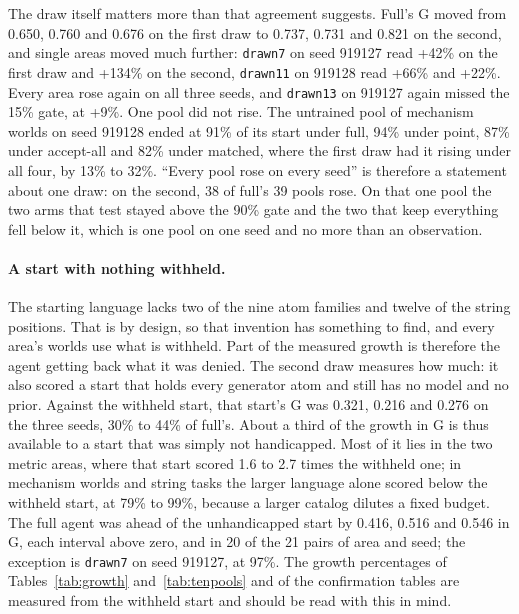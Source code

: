 \documentclass[11pt]{article}
\begin{document}
The draw itself matters more than that agreement suggests. Full's G moved from 0.650, 0.760 and 0.676 on the first draw to 0.737, 0.731 and 0.821 on the second, and single areas moved much further: \texttt{drawn7} on seed 919127 read +42\% on the first draw and +134\% on the second, \texttt{drawn11} on 919128 read +66\% and +22\%. Every area rose again on all three seeds, and \texttt{drawn13} on 919127 again missed the 15\% gate, at +9\%. One pool did not rise. The untrained pool of mechanism worlds on seed 919128 ended at 91\% of its start under full, 94\% under point, 87\% under accept-all and 82\% under matched, where the first draw had it rising under all four, by 13\% to 32\%. ``Every pool rose on every seed'' is therefore a statement about one draw: on the second, 38 of full's 39 pools rose. On that one pool the two arms that test stayed above the 90\% gate and the two that keep everything fell below it, which is one pool on one seed and no more than an observation.



\paragraph{A start with nothing withheld.} The starting language lacks two of the nine atom families and twelve of the string positions. That is by design, so that invention has something to find, and every area's worlds use what is withheld. Part of the measured growth is therefore the agent getting back what it was denied. The second draw measures how much: it also scored a start that holds every generator atom and still has no model and no prior. Against the withheld start, that start's G was 0.321, 0.216 and 0.276 on the three seeds, 30\% to 44\% of full's. About a third of the growth in G is thus available to a start that was simply not handicapped. Most of it lies in the two metric areas, where that start scored 1.6 to 2.7 times the withheld one; in mechanism worlds and string tasks the larger language alone scored below the withheld start, at 79\% to 99\%, because a larger catalog dilutes a fixed budget. The full agent was ahead of the unhandicapped start by 0.416, 0.516 and 0.546 in G, each interval above zero, and in 20 of the 21 pairs of area and seed; the exception is \texttt{drawn7} on seed 919127, at 97\%. The growth percentages of Tables~\ref{tab:growth} and~\ref{tab:tenpools} and of the confirmation tables are measured from the withheld start and should be read with this in mind.
\end{document}
